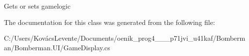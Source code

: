 Gets or sets gamelogic 



The documentation for this class was generated from the following file\+:\begin{DoxyCompactItemize}
\item 
C\+:/\+Users/\+Kovács\+Levente/\+Documents/oenik\+\_\+prog4\+\_\+\_\+\_\+p71jvi\+\_\+u41kaf/\+Bomberman/\+Bomberman.\+U\+I/Game\+Display.\+cs\end{DoxyCompactItemize}
